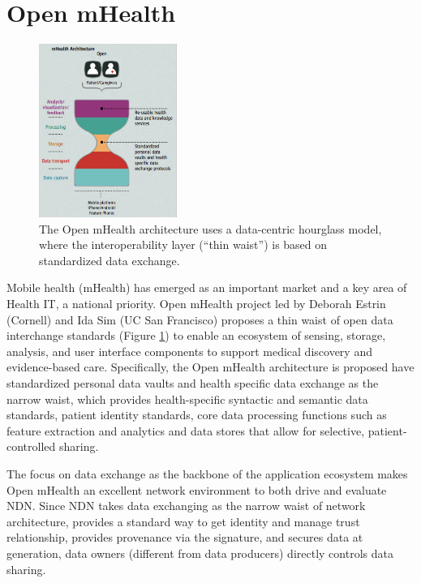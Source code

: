 \documentclass{article}
\begin{document}
\section{Open mHealth}

\begin{figure}
	\begin{center}
		\includegraphics[width=0.4\textwidth]{hourglass.png}
		\caption{The Open mHealth architecture uses a data-centric hourglass model, where the interoperability layer (``thin waist'') is based on standardized data exchange.~\cite{estrin2010open}}
		\label{fig:hourglass}
	\end{center}
\end{figure}

Mobile health (mHealth) has emerged as an important market and a key area of Health IT, a national priority. Open mHealth project \cite{estrin2010open} led by Deborah Estrin (Cornell) and Ida Sim (UC San Francisco) proposes a thin waist of open data interchange standards (Figure \ref{fig:hourglass}) to enable an ecosystem of sensing, storage, analysis, and user interface components to support medical discovery and evidence-based care. Specifically, the Open mHealth architecture is proposed have standardized personal data vaults and health specific data exchange as the narrow waist, which provides health-specific syntactic and semantic data standards, patient identity standards, core data processing functions such as feature extraction and analytics and data stores that allow for selective, patient-controlled sharing. 

The focus on data exchange as the backbone of the application ecosystem makes Open mHealth an excellent network environment to both drive and evaluate NDN. Since NDN takes data exchanging as the narrow waist of network architecture, provides a standard way to get identity and manage trust relationship, provides provenance via the signature, and secures data at generation, data owners (different from data producers) directly controls data sharing.
\end{document}
